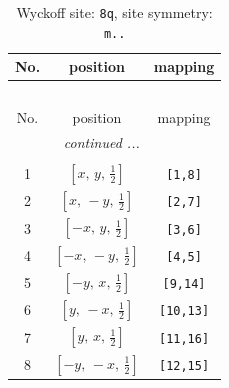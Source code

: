 \documentclass[fleqn,8pt]{jsarticle}
\begin{document}
\begin{longtable}{ccc}
\caption{Wyckoff site: {\tt 8q}, site symmetry: {\tt m..}}
 \\
 \hline \hline
No. & position & mapping \\ \hline \endfirsthead

\multicolumn{2}{l}{\tablename\ \thetable{}} \\
 \hline \hline
No. & position & mapping \\ \hline \endhead

 \hline \hline
\multicolumn{2}{r}{\footnotesize\it continued ...} \\ \endfoot

 \hline \hline
\multicolumn{2}{r}{} \\ \endlastfoot

1 & $\left[ x,\, y,\, \frac{1}{2} \right]$ & {\tt [1,8]} \\ \hline
2 & $\left[ x,\, - y,\, \frac{1}{2} \right]$ & {\tt [2,7]} \\ \hline
3 & $\left[ - x,\, y,\, \frac{1}{2} \right]$ & {\tt [3,6]} \\ \hline
4 & $\left[ - x,\, - y,\, \frac{1}{2} \right]$ & {\tt [4,5]} \\ \hline
5 & $\left[ - y,\, x,\, \frac{1}{2} \right]$ & {\tt [9,14]} \\ \hline
6 & $\left[ y,\, - x,\, \frac{1}{2} \right]$ & {\tt [10,13]} \\ \hline
7 & $\left[ y,\, x,\, \frac{1}{2} \right]$ & {\tt [11,16]} \\ \hline
8 & $\left[ - y,\, - x,\, \frac{1}{2} \right]$ & {\tt [12,15]} \\
\end{longtable}
\renewcommand{\arraystretch}{1.2}
\end{document}
